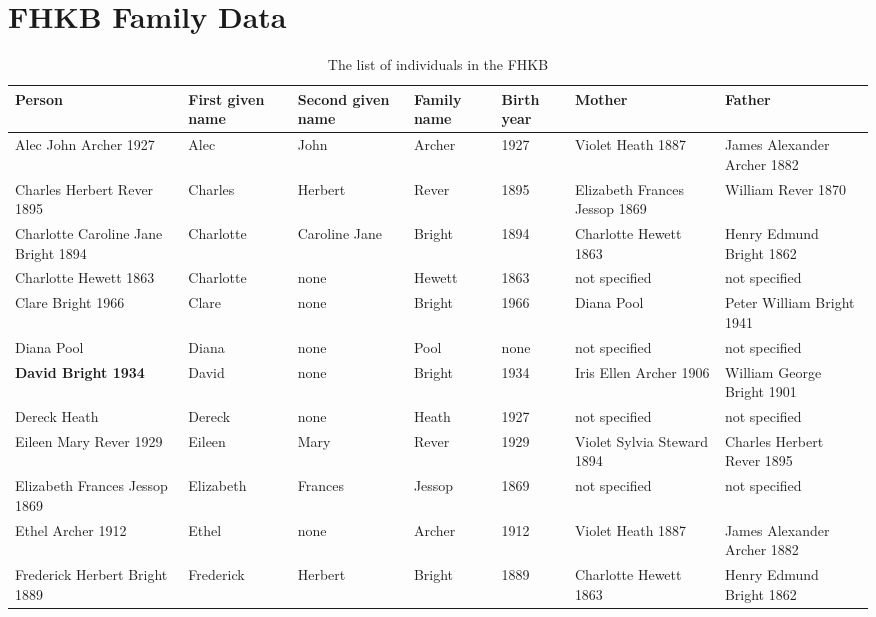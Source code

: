 \chapter{FHKB Family Data}
\label{chap:familydata}
\begin{landscape}
\begingroup
\small
\begin{longtable}{lp{2cm}p{2cm}lp{2cm}ll}
\caption{The list of individuals in the FHKB}\\
\label{tab:familydata}
\endhead
\hline \multicolumn{7}{l}{\emph{continued..}}
\endfoot
\endlastfoot
\textbf{Person} & First given name & Second given name & Family name & Birth year & Mother & Father \\ \hline
Alec John Archer 1927 & Alec & John & Archer & 1927 & Violet Heath 1887  & James Alexander Archer 1882  \\
\rowcolor{lightgray} Charles Herbert Rever 1895 & Charles & Herbert & Rever & 1895 & Elizabeth Frances Jessop 1869  & William Rever 1870  \\
Charlotte Caroline Jane Bright 1894 & Charlotte & Caroline Jane & Bright & 1894 & Charlotte Hewett 1863 & Henry Edmund Bright 1862 \\
Charlotte Hewett 1863 & Charlotte & none & Hewett & 1863 & not specified & not specified \\
\rowcolor{lightgray} Clare Bright 1966 & Clare & none & Bright & 1966 & Diana Pool & Peter William Bright 1941  \\
Diana Pool & Diana & none & Pool & none & not specified & not specified  \\
\rowcolor{lightgray} \textbf{David Bright 1934} & David & none & Bright & 1934 & Iris Ellen Archer 1906  & William George Bright 1901  \\
Dereck Heath & Dereck & none & Heath & 1927 & not specified & not specified \\
\rowcolor{lightgray} Eileen Mary Rever 1929 & Eileen & Mary & Rever & 1929 & Violet Sylvia Steward 1894  & Charles Herbert Rever 1895  \\
Elizabeth Frances Jessop 1869 & Elizabeth & Frances & Jessop & 1869 & not specified & not specified \\
Ethel Archer 1912 & Ethel & none & Archer & 1912 & Violet Heath 1887  & James Alexander Archer 1882  \\
Frederick Herbert Bright 1889 & Frederick & Herbert & Bright & 1889 & Charlotte Hewett 1863  & Henry Edmund Bright 1862  \\

\end{longtable}
\end{landscape}
